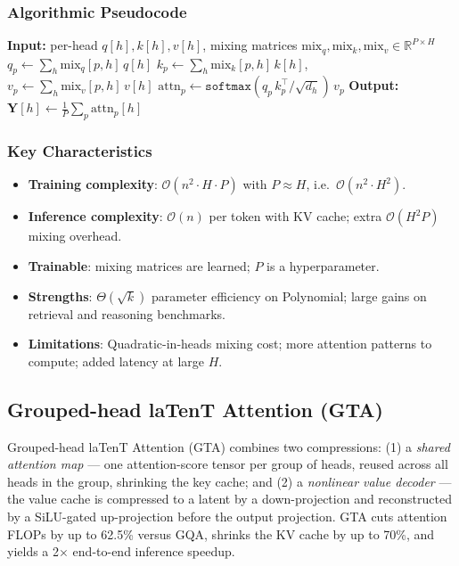 \subsubsection{Algorithmic Pseudocode}
\begin{algorithmic}[1]
\State \textbf{Input:} per-head $q[h], k[h], v[h]$, mixing matrices $\text{mix}_q, \text{mix}_k, \text{mix}_v \in \mathbb{R}^{P \times H}$
    \State $q_p \gets \sum_h \text{mix}_q[p,h]\, q[h]$ 
    \State $k_p \gets \sum_h \text{mix}_k[p,h]\, k[h]$, \quad $v_p \gets \sum_h \text{mix}_v[p,h]\, v[h]$
    \State $\text{attn}_p \gets \texttt{softmax}(q_p\, k_p^\top / \sqrt{d_h})\, v_p$
\EndFor
\State \textbf{Output:} $\mathbf{Y}[h] \gets \frac{1}{P} \sum_p \text{attn}_p[h]$ 
\end{algorithmic}

\subsubsection{Key Characteristics}
\begin{itemize}[leftmargin=*]
    \item \textbf{Training complexity}: $\mathcal{O}(n^2 \cdot H \cdot P)$ with $P \approx H$, i.e.\ $\mathcal{O}(n^2 \cdot H^2)$.
    \item \textbf{Inference complexity}: $\mathcal{O}(n)$ per token with KV cache; extra $\mathcal{O}(H^2 P)$ mixing overhead.
    \item \textbf{Trainable}: mixing matrices are learned; $P$ is a hyperparameter.
    \item \textbf{Strengths}: $\Theta(\sqrt{k})$ parameter efficiency on Polynomial; large gains on retrieval and reasoning benchmarks.
    \item \textbf{Limitations}: Quadratic-in-heads mixing cost; more attention patterns to compute; added latency at large $H$.
\end{itemize}

\subsection{Grouped-head laTenT Attention (GTA)}
Grouped-head laTenT Attention (GTA) \citep{sun_gta_2025} combines two compressions: (1) a \emph{shared attention map} --- one attention-score tensor per group of heads, reused across all heads in the group, shrinking the key cache; and (2) a \emph{nonlinear value decoder} --- the value cache is compressed to a latent by a down-projection and reconstructed by a SiLU-gated up-projection before the output projection. GTA cuts attention FLOPs by up to 62.5\% versus GQA, shrinks the KV cache by up to 70\%, and yields a 2$\times$ end-to-end inference speedup.

